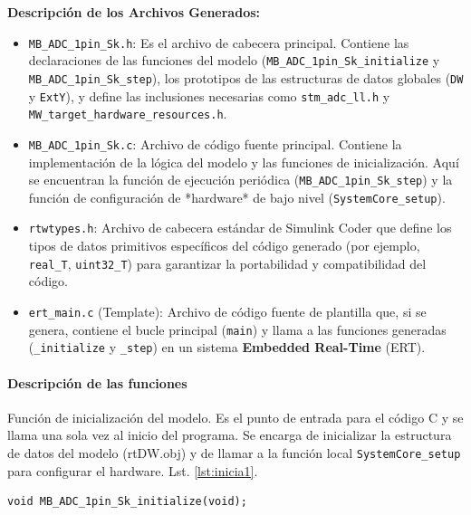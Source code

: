 \vspace{0.3cm}
\noindent \textbf{Descripción de los Archivos Generados:}
\begin{itemize}
	\item \texttt{MB\_ADC\_1pin\_Sk.h}: Es el archivo de cabecera principal. Contiene las declaraciones de las funciones del modelo (\texttt{MB\_ADC\_1pin\_Sk\_initialize} y \texttt{MB\_ADC\_1pin\_Sk\_step}), los prototipos de las estructuras de datos globales (\texttt{DW} y \texttt{ExtY}), y define las inclusiones necesarias como \texttt{stm\_adc\_ll.h} y \texttt{MW\_target\_hardware\_resources.h}.
	\item \texttt{MB\_ADC\_1pin\_Sk.c}: Archivo de código fuente principal. Contiene la implementación de la lógica del modelo y las funciones de inicialización. Aquí se encuentran la función de ejecución periódica (\texttt{MB\_ADC\_1pin\_Sk\_step}) y la función de configuración de *hardware* de bajo nivel (\texttt{SystemCore\_setup}).
	\item \texttt{rtwtypes.h}: Archivo de cabecera estándar de Simulink Coder que define los tipos de datos primitivos específicos del código generado (por ejemplo, \texttt{real\_T}, \texttt{uint32\_T}) para garantizar la portabilidad y compatibilidad del código.
	\item \texttt{ert\_main.c} (Template): Archivo de código fuente de plantilla que, si se genera, contiene el bucle principal (\texttt{main}) y llama a las funciones generadas (\texttt{\_initialize} y \texttt{\_step}) en un sistema \textbf{Embedded Real-Time} (ERT).
\end{itemize}


\paragraph{Descripción de las funciones} 
Función de inicialización del modelo. Es el punto de entrada para el código C y se llama una sola vez al inicio del programa. Se encarga de inicializar la estructura de datos del modelo (rtDW.obj) y de llamar a la función local \texttt{SystemCore\_setup}  para configurar el hardware. Lst. \ref{lst:inicia1}. \\
\begin{minipage}{\textwidth}
	\begin{lstlisting}[caption={Función de inicialización}, label={lst:inicia1}]
	void MB_ADC_1pin_Sk_initialize(void);
	\end{lstlisting}
\end{minipage}		

